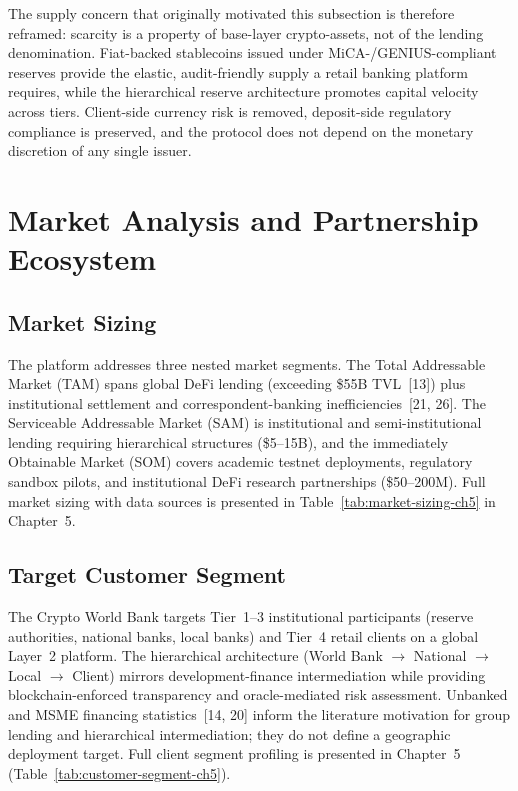 \documentclass[12pt,a4paper]{report}
\begin{document}
The supply concern that originally motivated this subsection is therefore reframed: scarcity is a property of base-layer crypto-assets, not of the lending denomination. Fiat-backed stablecoins issued under MiCA-/GENIUS-compliant reserves provide the elastic, audit-friendly supply a retail banking platform requires, while the hierarchical reserve architecture promotes capital velocity across tiers. Client-side currency risk is removed, deposit-side regulatory compliance is preserved, and the protocol does not depend on the monetary discretion of any single issuer.

\section{Market Analysis and Partnership Ecosystem}

\subsection{Market Sizing}

The platform addresses three nested market segments. The Total Addressable Market (TAM) spans global DeFi lending (exceeding \$55B TVL~[13]) plus institutional settlement and correspondent-banking inefficiencies~[21, 26]. The Serviceable Addressable Market (SAM) is institutional and semi-institutional lending requiring hierarchical structures (\$5--15B), and the immediately Obtainable Market (SOM) covers academic testnet deployments, regulatory sandbox pilots, and institutional DeFi research partnerships (\$50--200M). Full market sizing with data sources is presented in Table~\ref{tab:market-sizing-ch5} in Chapter~5.

\subsection{Target Customer Segment}

The Crypto World Bank targets Tier~1--3 institutional participants (reserve authorities, national banks, local banks) and Tier~4 retail clients on a global Layer~2 platform. The hierarchical architecture (World Bank $\to$ National $\to$ Local $\to$ Client) mirrors development-finance intermediation while providing blockchain-enforced transparency and oracle-mediated risk assessment. Unbanked and MSME financing statistics~[14, 20] inform the literature motivation for group lending and hierarchical intermediation; they do not define a geographic deployment target. Full client segment profiling is presented in Chapter~5 (Table~\ref{tab:customer-segment-ch5}).
\end{document}
